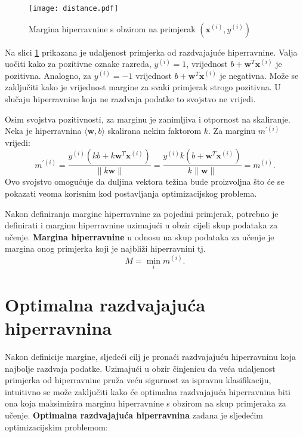 \documentclass[times, utf8, zavrsni, numeric]{fer}
\newcommand{\hiperravnina}{$\langle \mathbf{w}, b \rangle$}
\begin{document}
\begin{figure}
\centering
\texttt{[image: distance.pdf]}
\caption{Margina hiperravnine s obzirom na primjerak $(\mathbf{x}^{(i)}, y^{(i)})$}
\label{fig:mex}
\end{figure}

\par Na slici \ref{fig:mex} prikazana je udaljenost primjerka od razdvajajuće hiperravnine.
Valja uočiti kako za pozitivne oznake razreda, $y^{(i)} = 1$, vrijednost $b + \mathbf{w}^T\mathbf{x}^{(i)}$ je pozitivna.
Analogno, za $y^{(i)} = -1$ vrijednost $b + \mathbf{w}^T\mathbf{x}^{(i)}$ je negativna.
Može se zaključiti kako je vrijednost margine za svaki primjerak strogo pozitivna. 
U slučaju hiperravnine koja ne razdvaja podatke to svojstvo ne vrijedi.

\par Osim svojstva pozitivnosti, za marginu je zanimljiva i otpornost na skaliranje. 
Neka je hiperravnina \hiperravnina{} skalirana nekim faktorom $k$. Za marginu $m^{'(i)}$ vrijedi:
\begin{equation*}
  m^{'(i)} = \frac{y^{(i)}(kb + k\mathbf{w}^T\mathbf{x}^{(i)})}{\|k\mathbf{w}\|} =
  \frac{y^{(i)}k(b + \mathbf{w}^T\mathbf{x}^{(i)})}{k\|\mathbf{w}\|} = m^{(i)}.
\end{equation*}
Ovo svojstvo omogućuje da duljina vektora težina bude proizvoljna što će se pokazati veoma korisnim kod
postavljanja optimizacijskog problema.

\par Nakon definiranja margine hiperravnine za pojedini primjerak, potrebno je definirati 
i marginu hiperravnine uzimajući u obzir cijeli skup podataka za učenje. 
\textbf{Margina hiperravnine} u odnosu na skup podataka za učenje 
je margina onog primjerka koji je najbliži hiperravnini tj.
$$M=\min_{i}m^{(i)}.$$

\section{Optimalna razdvajajuća hiperravnina} \label{opthiper}
Nakon definicije margine, sljedeći cilj je pronaći razdvajajuću hiperravninu koja najbolje razdvaja podatke.
Uzimajući u obzir činjenicu da veća udaljenost primjerka od hiperravnine pruža veću sigurnost za ispravnu
klasifikaciju, intuitivno se može zaključiti kako će optimalna razdvajajuća hiperravnina biti ona koja
maksimizira marginu hiperravnine s obzirom na skup primjeraka za učenje. 
\textbf{Optimalna razdvajajuća hiperravnina} zadana je sljedećim optimizacijskim problemom:
\end{document}

